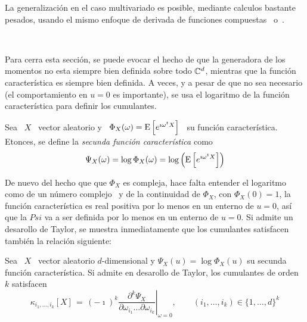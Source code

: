 {La  generalizaci\'on  en el  caso  multivariado  es  posible, mediante  calculos
bastante   pesados,  usando   el  mismo   enfoque  de   derivada   de  funciones
compuestas~\cite[Teo.~5.1.4]{Sta99} o~\cite{Har06, LacAmb97, Bri01, Shi84}.

\

Para cerra esta secci\'on, se puede evocar  el hecho de que la generadora de los
momentos no  esta siempre  bien definida sobre  todo $\mathbb{C}^d$, mientras  que la
funci\'on caracter\'istica es  siempre bien definida. A veces, y  a pesar de que
no sea necesario (el comportamiento en $u=0$ es importante), se usa el logaritmo
de la funci\'on caracter\'istica para definir los cumulantes.
%
\begin{definicion}
  Sea  \ $X$  \  vector aleatorio  y  \ $\Phi_X(\omega)  = \operatorname{E}\left[  e^{\imath
      \omega^t X}  \right]$ \ su funci\'on caracter\'istica.  Etonces, se define
  la {\em secunda funci\'on caracter\'istica} como
  \[
  \Psi_X(\omega)  =  \log   \Phi_X(\omega)  =  \log\left(  \operatorname{E}\left[  e^{\imath
        \omega^t X} \right] \right)
  \]
\end{definicion}
%
De  nuevo  del hecho  que  que  $\Phi_X$ es  compleja,  hace  falta entender  el
logaritmo  como   de  un  n\'umero  complejo~\cite{Abl03,  CarKro05}   y  de  la
continuidad de $\Phi_X$,  con $\Phi_X(0) = 1$, la  funci\'on caracter\'istica es
real positiva por lo menos en un enterno de $u = 0$, as\'i que la $Psi$ va a ser
definida  por lo menos  en un  enterno de  $u =  0$. Si  admite un  desarollo de
Taylor,  se muestra inmediatamente  que los  cumulantes satisfacen  tambi\'en la
relaci\'on siguiente:
%
\begin{lema}\label{Lem:MP:CumSecFctCarac}
%
  Sea \ $X$ \ vector aleatorio $d$-dimensional y $\Psi_X(u) = \log \Phi_X(u)$ su
  secunda  funci\'on caracter\'istica.  Si  admite en  desarollo de  Taylor, los
  cumulantes de orden $k$ satisfacen
  \[
  \kappa_{i_1,\ldots,i_k}[X]    \,   =   \,    (-\imath)^k   \left.\frac{\partial^k
      \Psi_X}{\partial    \omega_{i_1}    \ldots   \partial    \omega_{i_k}}
  \right|_{\omega   =    0},   \qquad    (i_1 , \ldots , i_k) \in \{ 1 , \ldots , d \}^k
  \]
\end{lema}


}
